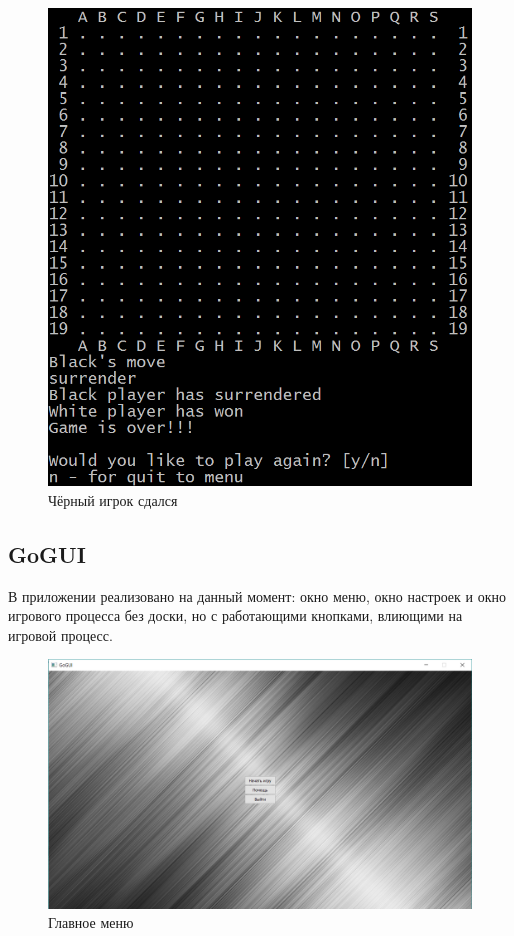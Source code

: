 \begin{figure}[H]
	\begin{center}
		\includegraphics[scale=0.6]{pics/GoCUI/Surrender.png}
	    \caption{Чёрный игрок сдался} 
		\label{pic:CUI_Surrender}
	\end{center}
\end{figure}

\subsection*{GoGUI}

В приложении реализовано на данный момент: окно меню, окно настроек и окно игрового процесса без доски, но с работающими кнопками,
влиющими на игровой процесс.

\begin{figure}[H]
	\begin{center}
		\includegraphics[scale=0.5]{pics/GoGUI/Menu.png}
	    \caption{Главное меню} 
		\label{pic:CUI_Menu}
	\end{center}
\end{figure}

